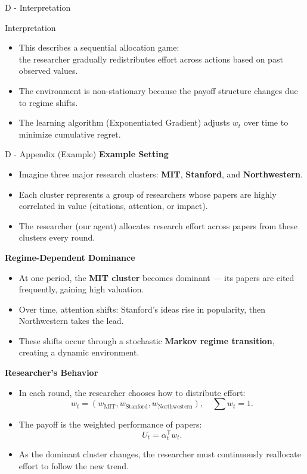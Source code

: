 \documentclass{beamer}
\begin{document}
\begin{frame}{D - Interpretation}
    \begin{block}{Interpretation}
    \begin{itemize}
        \item This describes a sequential allocation game:\\
              the researcher gradually redistributes effort across actions
              based on past observed values.
        \item The environment is non-stationary because
              the payoff structure changes due to regime shifts.
        \item The learning algorithm (Exponentiated Gradient)
              adjusts $w_t$ over time to minimize cumulative regret.
    \end{itemize}
    \end{block}
\end{frame}

\begin{frame}{D - Appendix (Example)}
\scriptsize
\textbf{Example Setting}
    \begin{itemize}
        \item Imagine three major research clusters:
              \textbf{MIT}, \textbf{Stanford}, and \textbf{Northwestern}.
        \item Each cluster represents a group of researchers 
              whose papers are highly correlated in value (citations, attention, or impact).
        \item The researcher (our agent) allocates research effort
              across papers from these clusters every round.
    \end{itemize}
\textbf{Regime-Dependent Dominance}
\begin{itemize}
        \item At one period, the \textbf{MIT cluster} becomes dominant 
              --- its papers are cited frequently, gaining high valuation.
        \item Over time, attention shifts:
              Stanford’s ideas rise in popularity,
              then Northwestern takes the lead.
        \item These shifts occur through a stochastic 
              \textbf{Markov regime transition}, 
              creating a dynamic environment.
    \end{itemize}
\textbf{Researcher’s Behavior}
\begin{itemize}
        \item In each round, the researcher chooses how to distribute effort:
              \[
              w_t = (w_{\text{MIT}}, w_{\text{Stanford}}, w_{\text{Northwestern}}),
              \quad \sum w_t = 1.
              \]
        \item The payoff is the weighted performance of papers:
              \[
              U_t = \alpha_t^{\mathsf{T}} w_t.
              \]
        \item As the dominant cluster changes, the researcher must 
              continuously reallocate effort to follow the new trend.
\end{itemize}
\end{frame}
\end{document}
